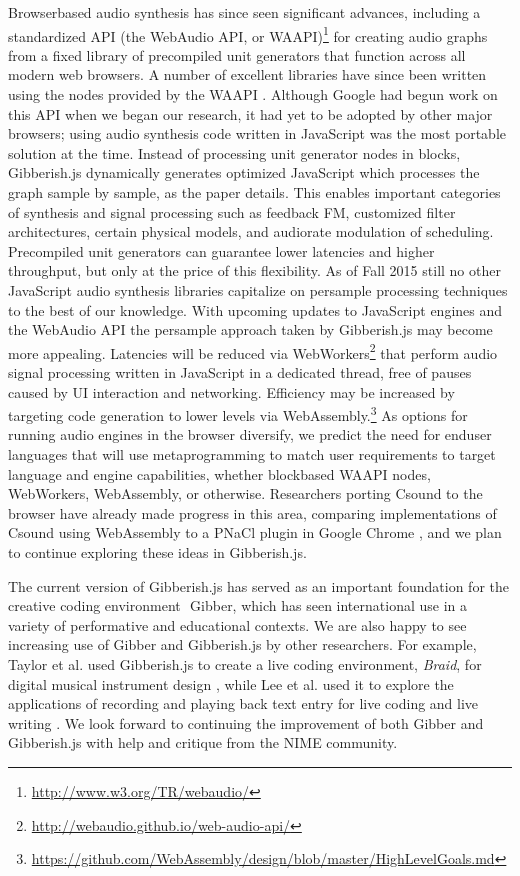 Browser­based audio synthesis has since seen significant advances, including a standardized API (the WebAudio API, or WAAPI​)\footnote{\url{http://www.w3.org/TR/webaudio/}} for creating audio graphs from a fixed library of pre­compiled unit generators that function across all modern web browsers. A number of excellent libraries have since been written using the nodes provided by the WAAPI  \cite{Choi:2013,Mann:2015}. Although Google had begun work on this API when we began our research, it had yet to be adopted by other major browsers; using audio synthesis code written in JavaScript was the most portable solution at the time. Instead of processing unit generator nodes in blocks, Gibberish.js dynamically generates optimized JavaScript which processes the graph sample by sample, as the paper details. This enables important categories of synthesis and signal processing such as feedback FM, customized filter architectures, certain physical models, and audio­rate modulation of scheduling. Pre­compiled unit generators can guarantee lower latencies and higher throughput, but only at the price of this flexibility. As of Fall 2015 still no other JavaScript audio synthesis libraries capitalize on per­sample processing techniques to the best of our knowledge. With upcoming updates to JavaScript engines and the WebAudio API the per­sample approach taken by Gibberish.js may become more appealing. Latencies will be reduced via WebWorkers​\footnote{\url{http://webaudio.github.io/web-audio-api/}} that perform audio signal processing written in JavaScript in a dedicated thread, free of pauses caused by UI interaction and networking. Efficiency may be increased by targeting code generation to lower levels via WebAssembly.​\footnote{\url{https://github.com/WebAssembly/design/blob/master/HighLevelGoals.md}} As options for running audio engines in the browser diversify, we predict the need for end­user languages that will use meta­programming to match user requirements to target language and engine capabilities, whether block­based WAAPI nodes, WebWorkers, WebAssembly, or otherwise. Researchers porting Csound to the browser have already made progress in this area, comparing implementations of Csound using WebAssembly to a PNaCl plugin in Google Chrome  \cite{Lazzarini:2014}, and we plan to continue exploring these ideas in Gibberish.js.
 
The current version of Gibberish.js has served as an important foundation for the creative coding environment ​ Gibber, which has seen international use in a variety of performative and educational contexts. We are also happy to see increasing use of Gibber and Gibberish.js by other researchers. For example, Taylor et al. used Gibberish.js to create a live coding environment, ​\emph{Braid}, for digital musical instrument design  \cite{Taylor:2015}, while Lee et al. used it to explore the applications of recording and playing back text entry for live coding and live writing  \cite{Lee:2015}. We look forward to continuing the improvement of both Gibber and Gibberish.js with help and critique from the NIME community.
 
